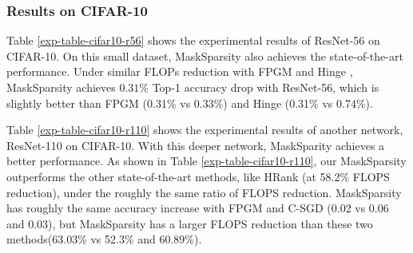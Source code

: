\documentclass[review]{cvpr}
\begin{document}
 

\subsubsection{Results on CIFAR-10}\label{results_on_cifar10}

Table \ref{exp-table-cifar10-r56} shows the experimental results of ResNet-56 on CIFAR-10. On this small dataset, MaskSparsity also achieves the state-of-the-art performance. Under similar FLOPs reduction with FPGM \cite{FPGM} and Hinge \cite{Hinge}, MaskSparsity achieves $0.31\%$ Top-1 accuracy drop with ResNet-56, which is slightly better than FPGM \cite{FPGM} (0.31\% vs 0.33\%) and Hinge \cite{Hinge} (0.31\% vs 0.74\%).

Table \ref{exp-table-cifar10-r110} shows the experimental results of another network, ResNet-110 on CIFAR-10. With this deeper network, MaskSparity achieves a better performance. As shown in Table \ref{exp-table-cifar10-r110}, our MaskSparsity outperforms the other state-of-the-art methods, like HRank \cite{HRank} (at 58.2\% FLOPS reduction), under the roughly the same ratio of FLOPS reduction. MaskSparsity has roughly the same accuracy increase with FPGM \cite{FPGM} and C-SGD \cite{CSGD} (0.02 vs 0.06 and 0.03), but MaskSparsity has a larger FLOPS reduction than these two methods(63.03\% vs 52.3\% and 60.89\%).
  







\end{document}
